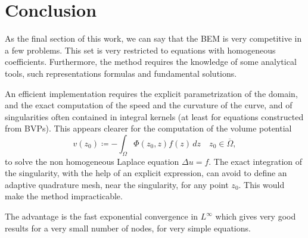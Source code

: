\documentclass[10pt, a4paper]{article} %
\numberwithin{equation}{section}
\theoremstyle{definition}
\theoremstyle{plain}
\theoremstyle{plain}
\theoremstyle{plain}
\theoremstyle{plain}
\theoremstyle{plain}
\theoremstyle{plain}
\theoremstyle{plain}
\theoremstyle{plain}
\begin{document}
\section{Conclusion}
As the final section of this work, we can say that the BEM is very competitive
in a few problems. This set is very restricted to equations with homogeneous coefficients.
Furthermore, the method requires the knowledge of some analytical tools, such
representations formulas and fundamental solutions.
\par
An efficient implementation requires the explicit parametrization of the domain, and 
the exact computation of the speed and the curvature of the curve, and of singularities
often contained in integral kernels (at least for equations constructed from BVPs).
This appears clearer for the computation of the volume potential
\begin{equation}
 v(z_0)\coloneqq-\int_\Omega\Phi(z_0, z)f(z)\,dz\quad z_0 \in \overline{\Omega},
\end{equation}
to solve the non homogeneous Laplace equation $\Delta u = f$. The exact integration
of the singularity, with the help of an explicit expression, can avoid to 
define an adaptive quadrature mesh, near the singularity, for any point $z_0$.
This would make the method impracticable.
\par
The advantage is the fast exponential convergence in $L^\infty$ which gives very good results
for a very small number of nodes, for very simple equations.
\clearpage

\printbibliography %
\end{document}
